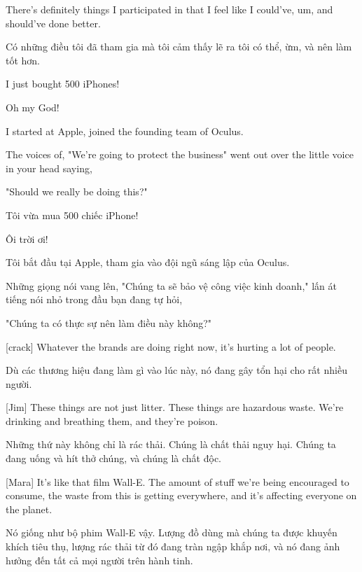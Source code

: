 \documentclass[a4paper]{article}
\begin{document}
	
	There's definitely things I participated in that I feel like I could've, um, and should've done better.
	
	\begin{vietnamese-v2}
		Có những điều tôi đã tham gia mà tôi cảm thấy lẽ ra tôi có thể, ừm, và nên làm tốt hơn.
	\end{vietnamese-v2}
	
	
	I just bought 500 iPhones!
	
	Oh my God!

	I started at Apple, joined the founding team of Oculus.

	The voices of, "We're going to protect the business" went out over the little voice in your head saying,

	"Should we really be doing this?"
	
	\begin{vietnamese-v2}
		Tôi vừa mua 500 chiếc iPhone!
		
		Ôi trời ơi!
		
		Tôi bắt đầu tại Apple, tham gia vào đội ngũ sáng lập của Oculus.
		
		Những giọng nói vang lên, "Chúng ta sẽ bảo vệ công việc kinh doanh," lấn át tiếng nói nhỏ trong đầu bạn đang tự hỏi,
		
		"Chúng ta có thực sự nên làm điều này không?"
	\end{vietnamese-v2}
	
	[crack]
	Whatever the brands are doing right now, it's hurting a lot of people.
	
	\begin{vietnamese-v2}
		[Bể nứt]
		
		Dù các thương hiệu đang làm gì vào lúc này, nó đang gây tổn hại cho rất nhiều người.
	\end{vietnamese-v2}
	
	[Jim] These things are not just litter. These things are hazardous waste. We're drinking and breathing them, and they're poison.

	\begin{vietnamese-v2}
		[Jim] Những thứ này không chỉ là rác thải. Chúng là chất thải nguy hại. Chúng ta đang uống và hít thở chúng, và chúng là chất độc.
	\end{vietnamese-v2}
	
	[Mara] It's like that film Wall-E. The amount of stuff we're being encouraged to consume, the waste from this is getting everywhere, and it's affecting everyone on the planet.
	
	\begin{vietnamese-v2}
		[Mara] Nó giống như bộ phim Wall-E vậy. Lượng đồ dùng mà chúng ta được khuyến khích tiêu thụ, lượng rác thải từ đó đang tràn ngập khắp nơi, và nó đang ảnh hưởng đến tất cả mọi người trên hành tinh.
	\end{vietnamese-v2}
	
\end{document}
